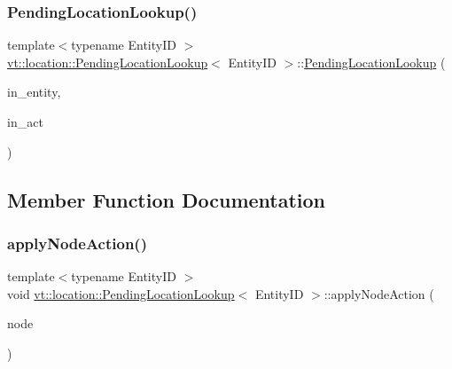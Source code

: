 \subsubsection{\texorpdfstring{Pending\+Location\+Lookup()}{PendingLocationLookup()}}
{\footnotesize\ttfamily template$<$typename Entity\+ID $>$ \\
\hyperlink{structvt_1_1location_1_1_pending_location_lookup}{vt\+::location\+::\+Pending\+Location\+Lookup}$<$ Entity\+ID $>$\+::\hyperlink{structvt_1_1location_1_1_pending_location_lookup}{Pending\+Location\+Lookup} (\begin{DoxyParamCaption}\item[{Entity\+ID const \&}]{in\+\_\+entity,  }\item[{\hyperlink{namespacevt_1_1location_a3a9235e0ceb341bef225d2cc46606e9e}{Node\+Action\+Type} const \&}]{in\+\_\+act }\end{DoxyParamCaption})\hspace{0.3cm}{\ttfamily [inline]}}



\subsection{Member Function Documentation}
\mbox{\label{structvt_1_1location_1_1_pending_location_lookup_a8e23682547f207d5403a0ee6a2224f37}} 
\subsubsection{\texorpdfstring{apply\+Node\+Action()}{applyNodeAction()}}
{\footnotesize\ttfamily template$<$typename Entity\+ID $>$ \\
void \hyperlink{structvt_1_1location_1_1_pending_location_lookup}{vt\+::location\+::\+Pending\+Location\+Lookup}$<$ Entity\+ID $>$\+::apply\+Node\+Action (\begin{DoxyParamCaption}\item[{\hyperlink{namespacevt_a866da9d0efc19c0a1ce79e9e492f47e2}{Node\+Type} const \&}]{node }\end{DoxyParamCaption})\hspace{0.3cm}{\ttfamily [inline]}}



